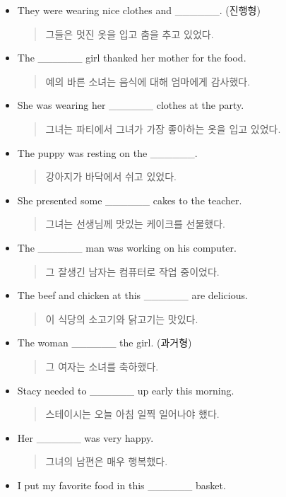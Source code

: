 \documentclass{article}
\begin{document}
\begin{addmargin}[1em]{1em}
\begin{itemize}
    \item They were wearing nice clothes and \_\_\_\_\_\_. (진행형)
    \begin{quote}
    그들은 멋진 옷을 입고 춤을 추고 있었다.
    \end{quote}
    \item The \_\_\_\_\_\_ girl thanked her mother for the food.
    \begin{quote}
    예의 바른 소녀는 음식에 대해 엄마에게 감사했다.
    \end{quote}
    \item She was wearing her \_\_\_\_\_\_ clothes at the party.
    \begin{quote}
    그녀는 파티에서 그녀가 가장 좋아하는 옷을 입고 있었다.
    \end{quote}
    \item The puppy was resting on the \_\_\_\_\_\_.
    \begin{quote}
    강아지가 바닥에서 쉬고 있었다.
    \end{quote}
    \item She presented some \_\_\_\_\_\_ cakes to the teacher.
    \begin{quote}
    그녀는 선생님께 맛있는 케이크를 선물했다.
    \end{quote}
    \item The \_\_\_\_\_\_ man was working on his computer.
    \begin{quote}
    그 잘생긴 남자는 컴퓨터로 작업 중이었다.
    \end{quote}
    \item The beef and chicken at this \_\_\_\_\_\_ are delicious.
    \begin{quote}
    이 식당의 소고기와 닭고기는 맛있다.
    \end{quote}
    \item The woman \_\_\_\_\_\_ the girl. (과거형)
    \begin{quote}
    그 여자는 소녀를 축하했다.
    \end{quote}
    \item Stacy needed to \_\_\_\_\_\_ up early this morning.
    \begin{quote}
    스테이시는 오늘 아침 일찍 일어나야 했다.
    \end{quote}
    \item Her \_\_\_\_\_\_ was very happy.
    \begin{quote}
    그녀의 남편은 매우 행복했다.
    \end{quote}
    \item I put my favorite food in this \_\_\_\_\_\_ basket.

\end{itemize}
\end{addmargin}
\end{document}
